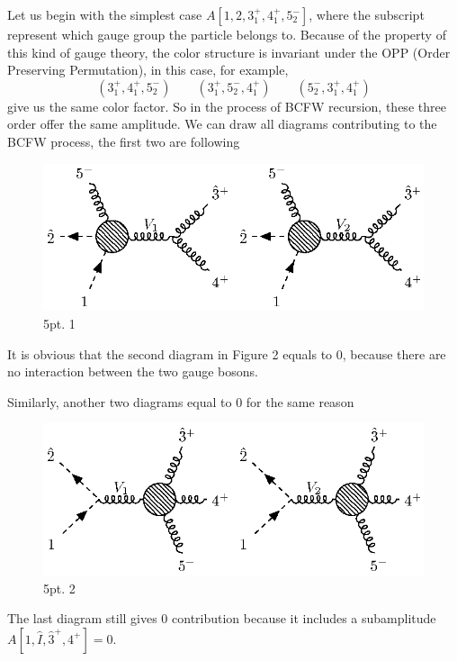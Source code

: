 \documentclass[12pt]{article}
\begin{document}
Let us begin with the simplest case $A[1,2,3_1^+,4_1^+,5_2^-]$, where the subscript represent which gauge group the particle belongs to. Because of the property 
of this kind of gauge theory, the color structure is invariant under the OPP (Order Preserving Permutation), in this case, for example,
\begin{equation*}
    (3_1^+,4_1^+,5_2^-)\qquad (3_1^+,5_2^-,4_1^+)\qquad(5_2^-,3_1^+,4_1^+)
\end{equation*}
give us the same color factor. So in the process of BCFW recursion, these three order offer the same amplitude. We can draw all diagrams contributing to the BCFW process, the first two are following
\par
\begin{figure}[H]
    \centering
    \includegraphics{5pt1.eps}
    \caption{5pt. 1}
    \label{2}
\end{figure}
It is obvious that the second diagram in Figure 2 equals to 0, because there are no interaction between the two gauge bosons.
\par
Similarly, another two diagrams equal to 0 for the same reason
\begin{figure}
    \centering
    \includegraphics{5pt2.eps}
    \caption{5pt. 2}
    \label{3}
\end{figure}
\par
The last diagram still gives 0 contribution because it includes a subamplitude $A[1,\hat{I},\hat{3}^+,4^+]=0$.
\par
\end{document}
